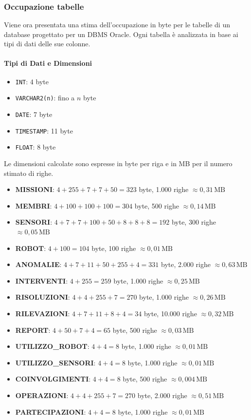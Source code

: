 \subsubsection{Occupazione tabelle}
Viene ora presentata una stima dell'occupazione in byte per le tabelle di un database progettato per un DBMS Oracle. Ogni tabella è analizzata in base ai tipi di dati delle sue colonne.

\paragraph{Tipi di Dati e Dimensioni}
\begin{itemize}
    \item \texttt{INT}: 4 byte
    \item \texttt{VARCHAR2(n)}: fino a $n$ byte
    \item \texttt{DATE}: 7 byte
    \item \texttt{TIMESTAMP}: 11 byte
    \item \texttt{FLOAT}: 8 byte
\end{itemize}

\noindent
Le dimensioni calcolate sono espresse in byte per riga e in MB per il numero stimato di righe.

\begin{itemize}
    \item \textbf{MISSIONI}: $4 + 255 + 7 + 7 + 50 = 323$ byte, 1.000 righe \(\approx 0,31\,\text{MB}\)
    \item \textbf{MEMBRI}: $4 + 100 + 100 + 100 = 304$ byte, 500 righe \(\approx 0,14\,\text{MB}\)
    \item \textbf{SENSORI}: $4 + 7 + 7 + 100 + 50 + 8 + 8 + 8 = 192$ byte, 300 righe \(\approx 0,05\,\text{MB}\)
    \item \textbf{ROBOT}: $4 + 100 = 104$ byte, 100 righe \(\approx 0,01\,\text{MB}\)
    \item \textbf{ANOMALIE}: $4 + 7 + 11 + 50 + 255 + 4 = 331$ byte, 2.000 righe \(\approx 0,63\,\text{MB}\)
    \item \textbf{INTERVENTI}: $4 + 255 = 259$ byte, 1.000 righe \(\approx 0,25\,\text{MB}\)
    \item \textbf{RISOLUZIONI}: $4 + 4 + 255 + 7 = 270$ byte, 1.000 righe \(\approx 0,26\,\text{MB}\)
    \item \textbf{RILEVAZIONI}: $4 + 7 + 11 + 8 + 4 = 34$ byte, 10.000 righe \(\approx 0,32\,\text{MB}\)
    \item \textbf{REPORT}: $4 + 50 + 7 + 4 = 65$ byte, 500 righe \(\approx 0,03\,\text{MB}\)
    \item \textbf{UTILIZZO\_ROBOT}: $4 + 4 = 8$ byte, 1.000 righe \(\approx 0,01\,\text{MB}\)
    \item \textbf{UTILIZZO\_SENSORI}: $4 + 4 = 8$ byte, 1.000 righe \(\approx 0,01\,\text{MB}\)
    \item \textbf{COINVOLGIMENTI}: $4 + 4 = 8$ byte, 500 righe \(\approx 0,004\,\text{MB}\)
    \item \textbf{OPERAZIONI}: $4 + 4 + 255 + 7 = 270$ byte, 2.000 righe \(\approx 0,51\,\text{MB}\)
    \item \textbf{PARTECIPAZIONI}: $4 + 4 = 8$ byte, 1.000 righe \(\approx 0,01\,\text{MB}\)
\end{itemize}

